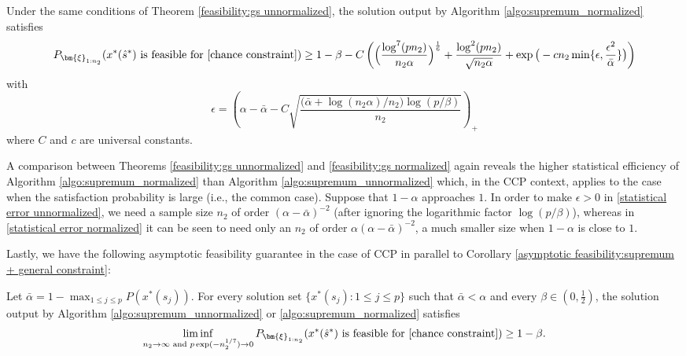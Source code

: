 \documentclass[mnsc,blindrev]{informs4} %
\newcommand{\prth}[1]{\left(#1\right)}
\begin{document}
\begin{theorem}\label{feasibility:gs normalized}
Under the same conditions of Theorem \ref{feasibility:gs unnormalized}, the solution output by Algorithm \ref{algo:supremum_normalized} satisfies
\begin{equation*}
P_{\bm{\xi}_{1:n_2}}(x^*(\hat s^*)\text{ is feasible for \eqref{chance constraint}})\geq 1-\beta-C\prth{\Big(\frac{\log^7(pn_2)}{n_2\alpha}\Big)^{\frac{1}{6}}+\frac{\log^2 (pn_2)}{\sqrt{n_2\alpha}}+\exp\big(-cn_2\min\{\epsilon,\frac{\epsilon^2}{\bar{\alpha}}\}\big)}
\end{equation*}
with
\begin{equation}\label{statistical error normalized}
    \epsilon=\prth{\alpha-\bar{\alpha}-C\sqrt{\frac{\big(\bar{\alpha}+\log (n_2\alpha)/n_2\big)\log (p/\beta)}{n_2}}}_+
\end{equation}
where $C$ and $c$ are universal constants.
\end{theorem}
A comparison between Theorems \ref{feasibility:gs unnormalized} and \ref{feasibility:gs normalized} again reveals the higher statistical efficiency of Algorithm \ref{algo:supremum_normalized} than Algorithm \ref{algo:supremum_unnormalized} which, in the CCP context, applies to the case when the satisfaction probability is large (i.e., the common case). Suppose that $1-\alpha$ approaches $1$. In order to make $\epsilon>0$ in \eqref{statistical error unnormalized}, we need a sample size $n_2$ of order $(\alpha-\bar{\alpha})^{-2}$ (after ignoring the logarithmic factor $\log(p/\beta)$), whereas in \eqref{statistical error normalized} it can be seen to need only an $n_2$ of order $\alpha(\alpha-\bar{\alpha})^{-2}$, a much smaller size when $1-\alpha$ is close to $1$.

Lastly, we have the following asymptotic feasibility guarantee in the case of CCP in parallel to Corollary \ref{asymptotic feasibility:supremum + general constraint}:
\begin{corollary}\label{asymptotic feasibility:supremum + chance constraint}
Let $\bar{\alpha}=1-\max_{1\leq j\leq p}P(x^*(s_j))$. For every solution set $\{x^*(s_j):1\leq j\leq p\}$ such that $\bar{\alpha}<\alpha$ and every $\beta\in(0,\frac{1}{2})$, the solution output by Algorithm \ref{algo:supremum_unnormalized} or \ref{algo:supremum_normalized} satisfies
\begin{equation*}
\liminf_{n_2\to\infty\text{ and }p\exp(-n_2^{1/7})\to 0}P_{\bm{\xi}_{1:n_2}}(x^*(\hat s^*)\text{ is feasible for \eqref{chance constraint}})\geq 1-\beta.
\end{equation*}
\end{corollary}
\end{document}
